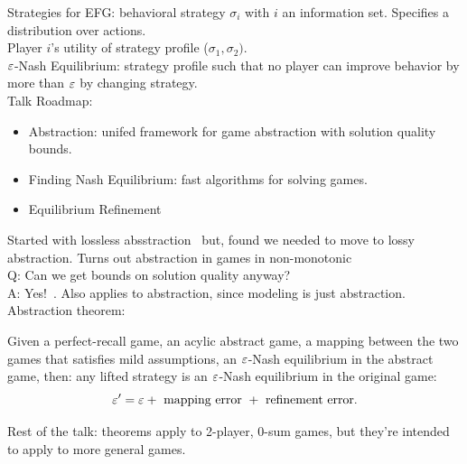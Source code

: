 
Strategies for EFG: behavioral strategy $\sigma_i$ with $i$ an information set. Specifies a distribution over actions. \\

Player $i$'s utility of strategy profile ($\sigma_1, \sigma_2)$. \\

$\varepsilon$-Nash Equilibrium: strategy profile such that no player can improve behavior by more than $\varepsilon$ by changing strategy. \\

Talk Roadmap:
\begin{itemize}
    \item Abstraction: unifed framework for game abstraction with solution quality bounds.
    \item Finding Nash Equilibrium: fast algorithms for solving games.
    \item Equilibrium Refinement
\end{itemize}


Started with lossless absstraction~\cite{gilpin2007lossless} but, found we needed to move to lossy abstraction. Turns out abstraction in games in non-monotonic~\cite{waugh2009abstraction} \\

Q: Can we get bounds on solution quality anyway?  \\

A: Yes!~\cite{sandholm2012lossy}. Also applies to abstraction, since modeling is just abstraction. \\

Abstraction theorem:
\begin{theorem}
Given a perfect-recall game, an acylic abstract game, a mapping between the two games that satisfies mild assumptions, an $\varepsilon$-Nash equilibrium in the abstract game, then: any lifted strategy is an $\varepsilon$-Nash equilibrium in the original game:
\[
\varepsilon' = \varepsilon + \text{ mapping error } + \text{ refinement error.}
\]
\end{theorem}

Rest of the talk: theorems apply to 2-player, 0-sum games, but they're intended to apply to more general games. \\

